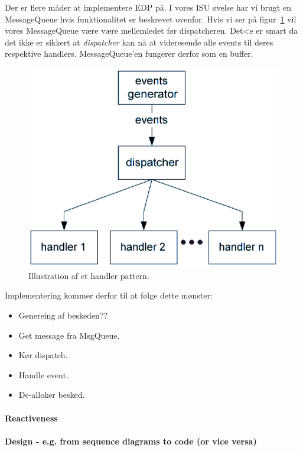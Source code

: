 Der er flere måder at implementere EDP på. I vores ISU øvelse har vi brugt en MessageQueue hvis funktionalitet er beskrevet ovenfor.
Hvis vi ser på figur~\ref{fig:handlPat} vil vores MessageQueue være være mellemledet før dispatcheren. Det<e er smart da det ikke er sikkert at \textit{dispatcher} kan nå at videresende alle events til deres respektive handlers. MessageQueue'en fungerer derfor som en buffer.

\begin{figure}[h]
	\centering
	\includegraphics[width=0.6\linewidth]{figs/spm3/handlersPattern}
	\caption{Illustration af et handler pattern.}
	\label{fig:handlPat}
\end{figure}

Implementering kommer derfor til at følge dette mønster:

\begin{itemize}
	\item Genereing af beskeden?? 
	\item Get message fra MsgQueue.
	\item Kør dispatch.
	\item Handle event.
	\item De-alloker besked.
\end{itemize}

\paragraph{Reactiveness}

\paragraph{Design - e.g. from sequence diagrams to code (or vice versa)}
